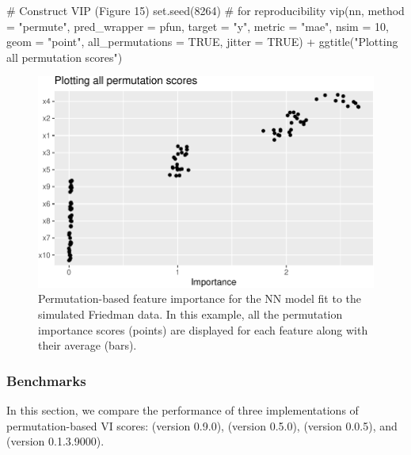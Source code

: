 \begin{Schunk}
\begin{Sinput}
# Construct VIP (Figure 15)
set.seed(8264)  # for reproducibility
vip(nn, method = "permute", pred_wrapper = pfun, target = "y", metric = "mae", 
    nsim = 10, geom = "point", all_permutations = TRUE, jitter = TRUE) +
  ggtitle("Plotting all permutation scores")
\end{Sinput}
\begin{figure}[!htb]

{\centering \includegraphics[width=0.7\linewidth]{greenwell-boehmke_files/figure-latex/vip-nn-mae-all-1} 

}

\caption[Permutation-based feature importance for the NN model fit to the simulated Friedman data]{Permutation-based feature importance for the NN model fit to the simulated Friedman data. In this example, all the permutation importance scores (points) are displayed for each feature along with their average (bars).}\label{fig:vip-nn-mae-all}
\end{figure}
\end{Schunk}

\subsubsection{Benchmarks}

In this section, we compare the performance of three implementations of
permutation-based VI scores:  (version 0.9.0),
 (version 0.5.0),
\newline {} (version 0.0.5), and
 (version 0.1.3.9000).


